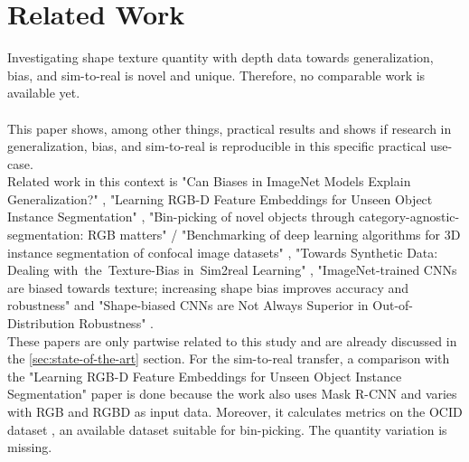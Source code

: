 	\section{Related Work}
	\label{sec:related-work}
		Investigating shape texture quantity with depth data towards generalization, bias, and sim-to-real is novel and unique. Therefore, no comparable work is available yet. \\
		\\
		This paper shows, among other things, practical results and shows if research in generalization, bias, and sim-to-real is reproducible in this specific practical use-case.\\
		Related work in this context is "Can Biases in ImageNet Models Explain Generalization?" \cite{Gavrikov2024}, "Learning RGB-D Feature Embeddings for Unseen Object Instance Segmentation" \cite{Xiang2021}, "Bin-picking of novel objects through category-agnostic-segmentation: RGB matters" \cite{Raj2023} / "Benchmarking of deep learning algorithms for 3D instance segmentation of confocal image datasets" \cite{Kar2022}, "Towards Synthetic Data: Dealing with the Texture-Bias in Sim2real Learning" \cite{Tabak2023}, "ImageNet-trained CNNs are biased towards texture; increasing shape bias improves accuracy and robustness" \cite{Geirhos2022} and "Shape-biased CNNs are Not Always Superior in Out-of-Distribution Robustness" \cite{Qiu2024}.\\
		These papers are only partwise related to this study and are already discussed in the \ref{sec:state-of-the-art} section.
		For the sim-to-real transfer, a comparison with the "Learning RGB-D Feature Embeddings for Unseen Object Instance Segmentation" \cite{Xiang2021} paper is done because the work also uses Mask R-CNN \cite{Kaiming2017} and varies with RGB and RGBD as input data. Moreover, it calculates metrics on the OCID dataset \cite{Suchi2019}, an available dataset suitable for bin-picking. The quantity variation is missing.
	
	
